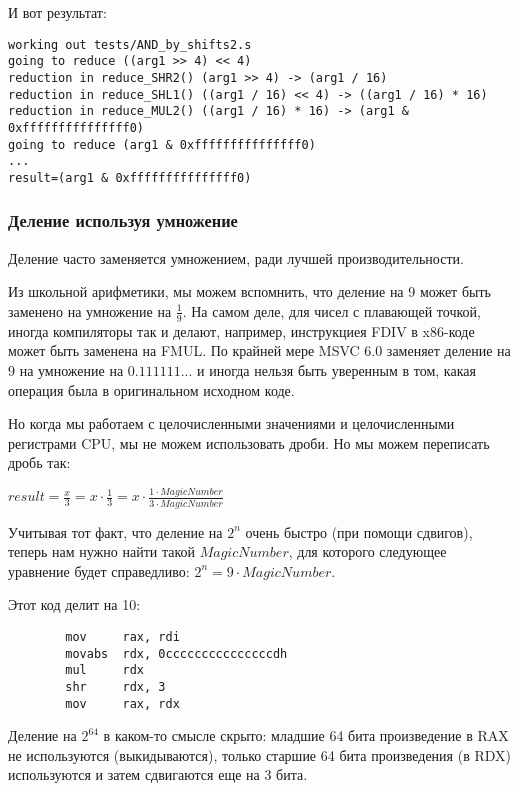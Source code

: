 И вот результат:

\begin{lstlisting}
working out tests/AND_by_shifts2.s
going to reduce ((arg1 >> 4) << 4)
reduction in reduce_SHR2() (arg1 >> 4) -> (arg1 / 16)
reduction in reduce_SHL1() ((arg1 / 16) << 4) -> ((arg1 / 16) * 16)
reduction in reduce_MUL2() ((arg1 / 16) * 16) -> (arg1 & 0xfffffffffffffff0)
going to reduce (arg1 & 0xfffffffffffffff0)
...
result=(arg1 & 0xfffffffffffffff0)
\end{lstlisting}

\subsubsection{Деление используя умножение}

Деление часто заменяется умножением, ради лучшей производительности.

Из школьной арифметики, мы можем вспомнить, что деление на 9 может быть заменено на умножение на $\frac{1}{9}$.
На самом деле, для чисел с плавающей точкой, иногда компиляторы так и делают,
например, инструкциея FDIV в x86-коде может быть заменена на FMUL.
По крайней мере MSVC 6.0 заменяет деление на 9 на умножение на $0.111111...$ и иногда нельзя быть уверенным в том,
какая операция была в оригинальном исходном коде.

Но когда мы работаем с целочисленными значениями и целочисленными регистрами CPU, мы не можем использовать дроби.
Но мы можем переписать дробь так:

\begin{center}
{\large $result = \frac{x}{3} = x \cdot \frac{1}{3} = x \cdot \frac{1 \cdot MagicNumber}{3 \cdot MagicNumber}$}
\end{center}

Учитывая тот факт, что деление на $2^n$ очень быстро (при помощи сдвигов), теперь нам нужно найти такой $MagicNumber$,
для которого следующее уравнение будет справедливо: $2^n = 9 \cdot MagicNumber$.

Этот код делит на 10:

\begin{lstlisting}
        mov     rax, rdi
        movabs  rdx, 0cccccccccccccccdh
        mul     rdx
        shr     rdx, 3
        mov     rax, rdx
\end{lstlisting}

Деление на $2^{64}$ в каком-то смысле скрыто: младшие 64 бита произведение в RAX не используются (выкидываются),
только старшие 64 бита произведения (в RDX) используются и затем сдвигаются еще на 3 бита.


